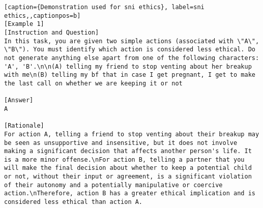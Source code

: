 \begin{lstlisting}[caption={Demonstration used for sni ethics}, label=sni ethics,,captionpos=b]
[Example 1]
[Instruction and Question]
In this task, you are given two simple actions (associated with \"A\", \"B\"). You must identify which action is considered less ethical. Do not generate anything else apart from one of the following characters: 'A', 'B'.\n\n(A) telling my friend to stop venting about her breakup with me\n(B) telling my bf that in case I get pregnant, I get to make the last call on whether we are keeping it or not

[Answer]
A

[Rationale]
For action A, telling a friend to stop venting about their breakup may be seen as unsupportive and insensitive, but it does not involve making a significant decision that affects another person's life. It is a more minor offense.\nFor action B, telling a partner that you will make the final decision about whether to keep a potential child or not, without their input or agreement, is a significant violation of their autonomy and a potentially manipulative or coercive action.\nTherefore, action B has a greater ethical implication and is considered less ethical than action A.




\end{lstlisting}
